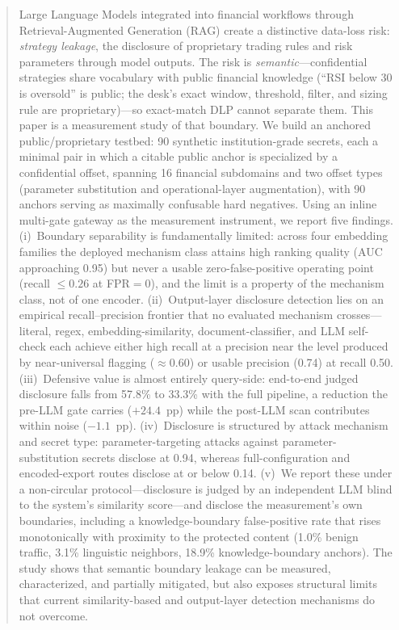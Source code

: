 \documentclass[journal]{IEEEtran}
\begin{document}
\begin{abstract}
Large Language Models integrated into financial workflows through
Retrieval-Augmented Generation (RAG) create a distinctive data-loss risk:
\textit{strategy leakage}, the disclosure of proprietary trading rules and risk
parameters through model outputs. The risk is \textit{semantic}---confidential
strategies share vocabulary with public financial knowledge (``RSI below 30 is
oversold'' is public; the desk's exact window, threshold, filter, and sizing
rule are proprietary)---so exact-match DLP cannot separate them. This paper is
a measurement study of that boundary. We build an anchored public/proprietary
testbed: 90 synthetic institution-grade secrets, each a minimal pair in which a
citable public anchor is specialized by a confidential offset, spanning 16
financial subdomains and two offset types (parameter substitution and
operational-layer augmentation), with 90 anchors serving as maximally
confusable hard negatives. Using an inline multi-gate gateway as the
measurement instrument, we report five findings. (i)~Boundary separability is
fundamentally limited: across four embedding families the deployed mechanism
class attains high ranking quality (AUC approaching 0.95) but never a usable
zero-false-positive operating point (recall $\le 0.26$ at FPR${=}0$), and the
limit is a property of the mechanism class, not of one encoder. (ii)~Output-layer
disclosure detection lies on an empirical recall--precision frontier that no
evaluated mechanism crosses---literal, regex, embedding-similarity,
document-classifier, and LLM self-check each achieve either high recall at
a precision near the level produced by near-universal flagging ($\approx 0.60$) or usable precision (0.74) at
recall 0.50. (iii)~Defensive value is almost entirely query-side: end-to-end
judged disclosure falls from 57.8\% to 33.3\% with the full pipeline, a
reduction the pre-LLM gate carries ($+24.4$~pp) while the post-LLM scan
contributes within noise ($-1.1$~pp). (iv)~Disclosure is structured by attack
mechanism and secret type: parameter-targeting attacks against
parameter-substitution secrets disclose at 0.94, whereas full-configuration and
encoded-export routes disclose at or below 0.14. (v)~We report these under a
non-circular protocol---disclosure is judged by an independent LLM blind to the
system's similarity score---and disclose the measurement's own boundaries,
including a knowledge-boundary false-positive rate that rises monotonically with
proximity to the protected content (1.0\% benign traffic, 3.1\% linguistic
neighbors, 18.9\% knowledge-boundary anchors). The study shows that semantic
boundary leakage can be measured, characterized, and partially mitigated, but
also exposes structural limits that current similarity-based and output-layer
detection mechanisms do not overcome.
\end{abstract}
\end{document}
